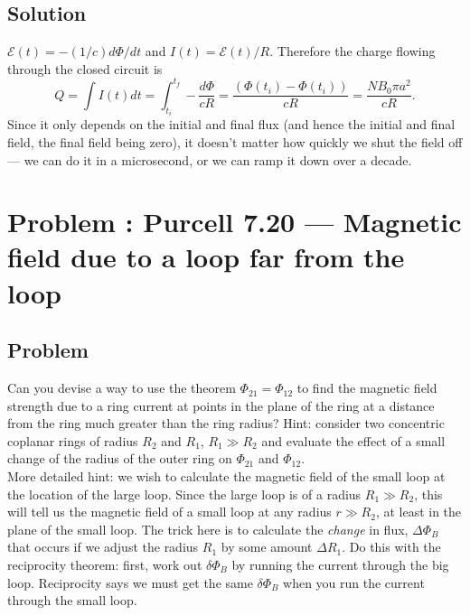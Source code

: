 \documentclass[solutions]{esg8022pset}
\begin{document}
\subsection{Solution}
 ${\mathcal{E}}(t) = -(1/c)d\Phi/dt$ and $I(t) =
{\mathcal{E}}(t)/R$.  Therefore the charge flowing through the closed
circuit is
\begin{equation}
Q=\int I(t)dt=\int_{t_{i}}^{t_{f}} -\frac{d\Phi}{cR}
= \frac{(\Phi(t_{i}) - \Phi(t_{i}))
}{cR}=\frac{NB_0\pi a^2}{cR}.
\end{equation}
Since it only depends on the initial and final flux (and hence the
initial and final field, the final field being zero), it doesn't matter how quickly we shut the
field off --- we can do it in a microsecond, or we can ramp it down
over a decade.
\section{Problem \thesection: Purcell 7.20 --- Magnetic field due to a loop far from the loop}
\subsection{Problem}
Can you devise a way to use the theorem $\Phi_{21}=\Phi_{12}$ to find the magnetic
 field strength due to a ring current at points in the plane of the ring at a distance from the ring much greater than the ring radius?
 Hint: consider two concentric coplanar rings of radius $R_{2}$ and $R_{1}$, $R_{1}\gg R_{2}$ and evaluate the effect of a small change
  of the radius of the outer ring on $\Phi_{21}$ and $\Phi_{12}$. \\

\noindent  More detailed hint:  we wish to calculate
the magnetic field of the small loop at the location of the large
loop.  Since the large loop is of a radius $R_1 \gg R_2$, this will
tell us the magnetic field of a small loop at any radius $r \gg R_2$,
at least in the plane of the small loop. The trick here is to calculate the {\it change} in
flux, $\Delta\Phi_B$ that occurs if we adjust the radius $R_1$ by
some amount $\Delta R_1$.  Do this with the reciprocity theorem:
first, work out $\delta\Phi_B$ by running the current through the big
loop.  Reciprocity says we must get the same
$\delta\Phi_B$ when you run the current through the small loop.
\end{document}
